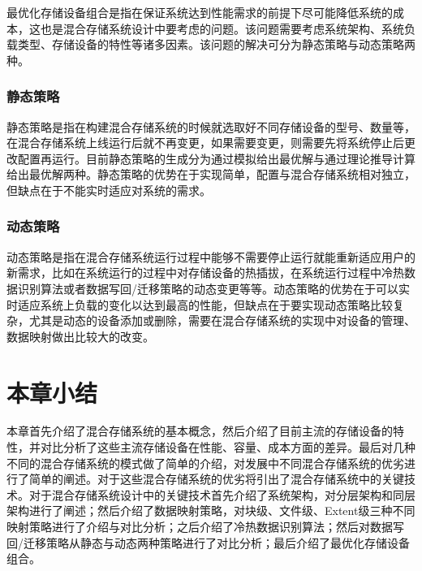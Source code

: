 最优化存储设备组合是指在保证系统达到性能需求的前提下尽可能降低系统的成本，这也是混合存储系统设计中要考虑的问题。该问题需要考虑系统架构、系统负载类型、存储设备的特性等诸多因素。该问题的解决可分为静态策略与动态策略两种。

\subsubsection{静态策略}

静态策略是指在构建混合存储系统的时候就选取好不同存储设备的型号、数量等，在混合存储系统上线运行后就不再变更，如果需要变更，则需要先将系统停止后更改配置再运行。目前静态策略的生成分为通过模拟\cite{guerra2011cost}给出最优解与通过理论推导计算\cite{kim2011hybridstore}给出最优解两种。静态策略的优势在于实现简单，配置与混合存储系统相对独立，但缺点在于不能实时适应对系统的需求。

\subsubsection{动态策略}

动态策略是指在混合存储系统运行过程中能够不需要停止运行就能重新适应用户的新需求，比如在系统运行的过程中对存储设备的热插拔，在系统运行过程中冷热数据识别算法或者数据写回/迁移策略的动态变更等等。动态策略的优势在于可以实时适应系统上负载的变化以达到最高的性能，但缺点在于要实现动态策略比较复杂，尤其是动态的设备添加或删除，需要在混合存储系统的实现中对设备的管理、数据映射做出比较大的改变。

\section{本章小结}

本章首先介绍了混合存储系统的基本概念，然后介绍了目前主流的存储设备的特性，并对比分析了这些主流存储设备在性能、容量、成本方面的差异。最后对几种不同的混合存储系统的模式做了简单的介绍，对发展中不同混合存储系统的优劣进行了简单的阐述。对于这些混合存储系统的优劣将引出了混合存储系统中的关键技术。对于混合存储系统设计中的关键技术首先介绍了系统架构，对分层架构和同层架构进行了阐述；然后介绍了数据映射策略，对块级、文件级、Extent级三种不同映射策略进行了介绍与对比分析；之后介绍了冷热数据识别算法；然后对数据写回/迁移策略从静态与动态两种策略进行了对比分析；最后介绍了最优化存储设备组合。